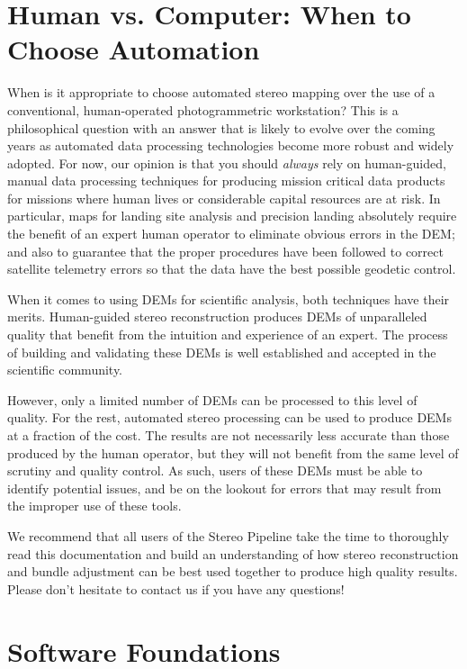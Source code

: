 \section{Human vs. Computer: When to Choose Automation}

When is it appropriate to choose automated stereo mapping over the use
of a conventional, human-operated photogrammetric workstation?  This
is a philosophical question with an answer that is likely to evolve
over the coming years as automated data processing technologies become
more robust and widely adopted.  For now, our opinion is that you
should {\em always} rely on human-guided, manual data processing
techniques for producing mission critical data products for missions
where human lives or considerable capital resources are at risk.  In
particular, maps for landing site analysis and precision landing
absolutely require the benefit of an expert human operator to
eliminate obvious errors in the \ac{DEM}; and also to guarantee that the
proper procedures have been followed to correct satellite telemetry
errors so that the data have the best possible geodetic control.

When it comes to using \acp{DEM} for scientific analysis, both techniques
have their merits.  Human-guided stereo reconstruction produces \acp{DEM}
of unparalleled quality that benefit from the intuition and experience
of an expert.  The process of building and validating these \acp{DEM} is
well established and accepted in the scientific community. 

However, only a limited number of \acp{DEM} can be processed to this level
of quality.  For the rest, automated stereo processing can be used to
produce \acp{DEM} at a fraction of the cost.  The results are not
necessarily less accurate than those produced by the human operator,
but they will not benefit from the same level of scrutiny and quality
control.  As such, users of these \acp{DEM} must be able to identify
potential issues, and be on the lookout for errors that may result
from the improper use of these tools.  

We recommend that all users of the Stereo Pipeline take the time to
thoroughly read this documentation and build an understanding of how
stereo reconstruction and bundle adjustment can be best used together to
produce high quality results.  Please don't hesitate to contact us if
you have any questions!

\section{Software Foundations}

